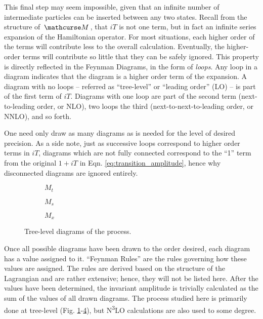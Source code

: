     This final step may seem impossible, given that an infinite number of intermediate particles can be inserted between any two states.
    Recall from the structure of $\invAmp$, that $iT$ is not one term, but in fact an infinite series expansion of the Hamiltonian operator.
    For most situations, each higher order of the terms will contribute less to the overall calculation.
    Eventually, the higher-order terms will contribute so little that they can be safely ignored.
    This property is directly reflected in the Feynman Diagrams, in the form of \textit{loops}.
    Any loop in a diagram indicates that the diagram is a higher order term of the expansion.
    A diagram with no loops -- referred as ``tree-level'' or ``leading order'' (LO) -- is part of the first term of $iT$.
    Diagrams with one loop are part of the second term (next-to-leading order, or NLO),
        two loops the third (next-to-next-to-leading order, or NNLO), and so forth.

    One need only draw as many diagrams as is needed for the level of desired precision.
    As a side note, just as successive loops correspond to higher order terms in $iT$,
        diagrams which are not fully connected correspond to the ``1'' term from the original $1+iT$ in Eqn. \ref{eq:transition_amplitude},
        hence why disconnected diagrams are ignored entirely.

    \begin{figure}
    \centering
    \begin{subfigure}{0.32\textwidth} 
         
        \caption{$M_t$}
        \label{fig:tree_level_vbfhh:kv}
    \end{subfigure}
    \begin{subfigure}{0.32\textwidth}
         
        \caption{$M_s$}
        \label{fig:tree_level_vbfhh:kl}
    \end{subfigure}
    \begin{subfigure}{0.32\textwidth}
         
        \caption{$M_x$}
        \label{fig:tree_level_vbfhh:k2v}
    \end{subfigure}
    \caption{Tree-level diagrams of the \hhproc process.}
    \end{figure}

    Once all possible diagrams have been drawn to the order desired, each diagram has a value assigned to it.
    ``Feynman Rules'' are the rules governing how these values are assigned.
    The rules are derived based on the structure of the Lagrangian and are rather extensive;
        hence, they will not be listed here.
    After the values have been determined, the invariant amplitude is trivially calculated as the sum of the values of all drawn diagrams.
    The \hhproc process studied here is primarily done at tree-level
        (Fig. \ref{fig:tree_level_vbfhh:kv}-\ref{fig:tree_level_vbfhh:k2v}),
        but N\textsuperscript{3}LO calculations are also used to some degree.

